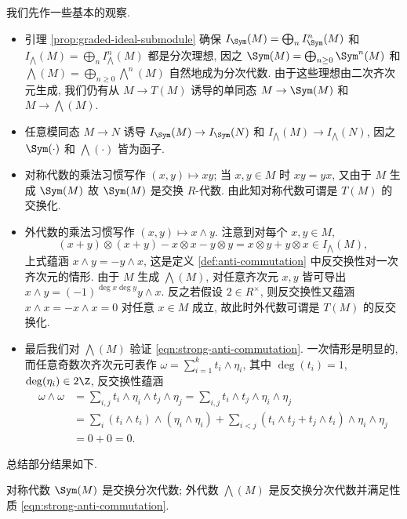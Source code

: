 我们先作一些基本的观察.
\begin{itemize}
	\item 引理 \ref{prop:graded-ideal-submodule} 确保 $I_{\Sym}(M) = \bigoplus_n I_{\Sym}^n(M)$ 和 $I_{\bigwedge}(M) = \bigoplus_n I_{\bigwedge}^n(M)$ 都是分次理想, 因之 $\Sym(M) = \bigoplus_{n \geq 0} \Sym^n(M)$ 和 $\bigwedge(M) = \bigoplus_{n \geq 0} \bigwedge^n(M)$ 自然地成为分次代数. 由于这些理想由二次齐次元生成, 我们仍有从 $M \to T(M)$ 诱导的单同态 $M \to \Sym(M)$ 和 $M \to \bigwedge(M)$.
	\item 任意模同态 $M \to N$ 诱导 $I_{\Sym}(M) \to I_{\Sym}(N)$ 和 $I_{\bigwedge}(M) \to I_{\bigwedge}(N)$, 因之 $\Sym(\cdot)$ 和 $\bigwedge(\cdot)$ 皆为函子.
	\item 对称代数的乘法习惯写作 $(x,y) \mapsto xy$; 当 $x, y \in M$ 时 $xy=yx$, 又由于 $M$ 生成 $\Sym(M)$ 故 $\Sym(M)$ 是交换 $R$-代数. 由此知对称代数可谓是 $T(M)$ 的交换化.
	\item 外代数的乘法习惯写作 $(x,y) \mapsto x \wedge y$. 注意到对每个 $x, y \in M$, 
		\[ (x+y) \otimes (x+y) - x \otimes x - y \otimes y = x \otimes y + y \otimes x \in I_{\bigwedge}(M), \]
		上式蕴涵 $x \wedge y = - y \wedge x$, 这是定义 \ref{def:anti-commutation} 中反交换性对一次齐次元的情形. 由于 $M$ 生成 $\bigwedge(M)$, 对任意齐次元 $x,y$ 皆可导出 $x \wedge y = (-1)^{\deg x \deg y} y \wedge x$. 反之若假设 $2 \in R^\times$, 则反交换性又蕴涵 $x \wedge x = - x \wedge x = 0$ 对任意 $x \in M$ 成立, 故此时外代数可谓是 $T(M)$ 的反交换化.
	\item 最后我们对 $\bigwedge(M)$ 验证 \eqref{eqn:strong-anti-commutation}. 一次情形是明显的, 而任意奇数次齐次元可表作 $\omega = \sum_{i=1}^k t_i \wedge \eta_i$, 其中 $\deg(t_i)=1$, $\deg(\eta_i) \in 2\Z$, 反交换性蕴涵
		\begin{align*}
			\omega \wedge \omega & = \sum_{i,j} t_i \wedge \eta_i \wedge t_j \wedge \eta_j = \sum_{i,j} t_i \wedge t_j \wedge \eta_i \wedge \eta_j \\
			& = \sum_i (t_i \wedge t_i) \wedge (\eta_i \wedge \eta_i) + \sum_{i < j} (t_i \wedge t_j + t_j \wedge t_i) \wedge \eta_i \wedge \eta_j \\
			& = 0 + 0 = 0.
		\end{align*}
\end{itemize}
总结部分结果如下.
\begin{lemma}\label{prop:Sym-wedge-properties}
	对称代数 $\Sym(M)$ 是交换分次代数; 外代数 $\bigwedge(M)$ 是反交换分次代数并满足性质 \eqref{eqn:strong-anti-commutation}.
\end{lemma}

